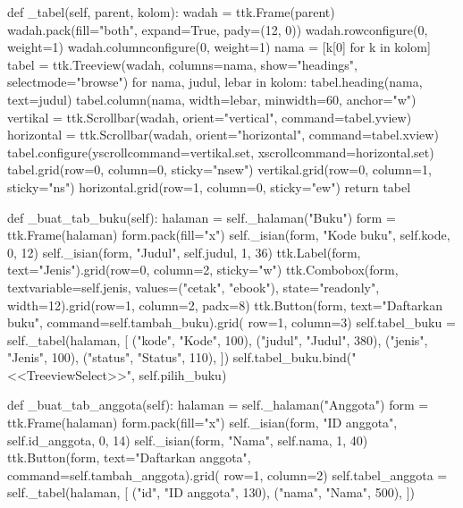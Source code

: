 \begin{kode}[gui.py]
    def _tabel(self, parent, kolom):
        wadah = ttk.Frame(parent)
        wadah.pack(fill="both", expand=True, pady=(12, 0))
        wadah.rowconfigure(0, weight=1)
        wadah.columnconfigure(0, weight=1)
        nama = [k[0] for k in kolom]
        tabel = ttk.Treeview(wadah, columns=nama, show="headings",
                             selectmode="browse")
        for nama, judul, lebar in kolom:
            tabel.heading(nama, text=judul)
            tabel.column(nama, width=lebar, minwidth=60, anchor="w")
        vertikal = ttk.Scrollbar(wadah, orient="vertical", command=tabel.yview)
        horizontal = ttk.Scrollbar(wadah, orient="horizontal", command=tabel.xview)
        tabel.configure(yscrollcommand=vertikal.set,
                        xscrollcommand=horizontal.set)
        tabel.grid(row=0, column=0, sticky="nsew")
        vertikal.grid(row=0, column=1, sticky="ns")
        horizontal.grid(row=1, column=0, sticky="ew")
        return tabel

    def _buat_tab_buku(self):
        halaman = self._halaman("Buku")
        form = ttk.Frame(halaman)
        form.pack(fill="x")
        self._isian(form, "Kode buku", self.kode, 0, 12)
        self._isian(form, "Judul", self.judul, 1, 36)
        ttk.Label(form, text="Jenis").grid(row=0, column=2, sticky="w")
        ttk.Combobox(form, textvariable=self.jenis, values=("cetak", "ebook"),
                     state="readonly", width=12).grid(row=1, column=2, padx=8)
        ttk.Button(form, text="Daftarkan buku", command=self.tambah_buku).grid(
            row=1, column=3)
        self.tabel_buku = self._tabel(halaman, [
            ("kode", "Kode", 100), ("judul", "Judul", 380),
            ("jenis", "Jenis", 100), ("status", "Status", 110),
        ])
        self.tabel_buku.bind("<<TreeviewSelect>>", self.pilih_buku)

    def _buat_tab_anggota(self):
        halaman = self._halaman("Anggota")
        form = ttk.Frame(halaman)
        form.pack(fill="x")
        self._isian(form, "ID anggota", self.id_anggota, 0, 14)
        self._isian(form, "Nama", self.nama, 1, 40)
        ttk.Button(form, text="Daftarkan anggota", command=self.tambah_anggota).grid(
            row=1, column=2)
        self.tabel_anggota = self._tabel(halaman, [
            ("id", "ID anggota", 130), ("nama", "Nama", 500),
        ])


\end{kode}
